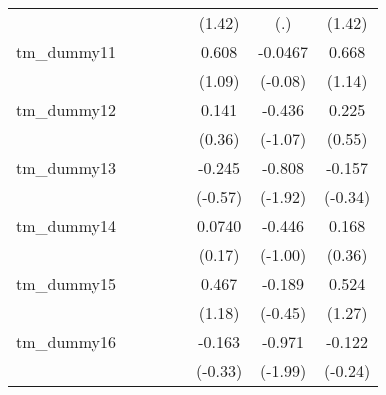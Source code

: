 {\begin{tabular}{l*{7}{c}}
            &                     &                     &                     &                     &      (1.42)         &         (.)         &      (1.42)         \\
[1em]
tm\_dummy11  &                     &                     &                     &                     &       0.608         &     -0.0467         &       0.668         \\
            &                     &                     &                     &                     &      (1.09)         &     (-0.08)         &      (1.14)         \\
[1em]
tm\_dummy12  &                     &                     &                     &                     &       0.141         &      -0.436         &       0.225         \\
            &                     &                     &                     &                     &      (0.36)         &     (-1.07)         &      (0.55)         \\
[1em]
tm\_dummy13  &                     &                     &                     &                     &      -0.245         &      -0.808         &      -0.157         \\
            &                     &                     &                     &                     &     (-0.57)         &     (-1.92)         &     (-0.34)         \\
[1em]
tm\_dummy14  &                     &                     &                     &                     &      0.0740         &      -0.446         &       0.168         \\
            &                     &                     &                     &                     &      (0.17)         &     (-1.00)         &      (0.36)         \\
[1em]
tm\_dummy15  &                     &                     &                     &                     &       0.467         &      -0.189         &       0.524         \\
            &                     &                     &                     &                     &      (1.18)         &     (-0.45)         &      (1.27)         \\
[1em]
tm\_dummy16  &                     &                     &                     &                     &      -0.163         &      -0.971\sym{*}  &      -0.122         \\
            &                     &                     &                     &                     &     (-0.33)         &     (-1.99)         &     (-0.24)         \\

\end{tabular}}
